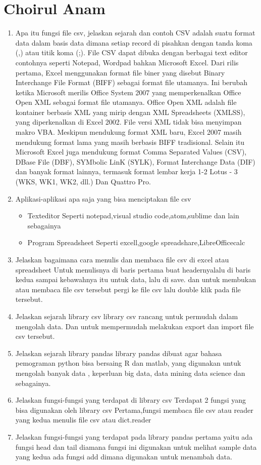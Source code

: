 \section{Choirul Anam}
\begin{enumerate}
    \item Apa itu fungsi file csv, jelaskan sejarah dan contoh
    CSV adalah suatu format data dalam basis data dimana setiap record di pisahkan dengan tanda koma (,) atau titik koma (;). File CSV dapat dibuka dengan berbagai text editor contohnya seperti Notepad, Wordpad bahkan Microsoft Excel.
    Dari rilis pertama, Excel menggunakan format file biner yang disebut Binary Interchange File Format (BIFF) sebagai format file utamanya. Ini berubah ketika Microsoft merilis Office System 2007 yang memperkenalkan Office Open XML sebagai format file utamanya. Office Open XML adalah file kontainer berbasis XML yang mirip dengan XML Spreadsheets (XMLSS), yang diperkenalkan di Excel 2002. File versi XML tidak bisa menyimpan makro VBA.
    Meskipun mendukung format XML baru, Excel 2007 masih mendukung format lama yang masih berbasis BIFF tradisional. Selain itu Microsoft Excel juga mendukung format Comma Separated Values (CSV), DBase File (DBF), SYMbolic LinK (SYLK), Format Interchange Data (DIF) dan banyak format lainnya, termasuk format lembar kerja 1-2 Lotus - 3 (WKS, WK1, WK2, dll.) Dan Quattro Pro.
    \item Aplikasi-aplikasi apa saja yang bisa menciptakan file csv
    \begin{itemize}
        \item Texteditor
        Seperti notepad,visual studio code,atom,sublime dan lain sebagainya
        \item Program Spreadsheet
        Seperti excell,google spreadshare,LibreOfficecalc
    \end{itemize}
    \item Jelaskan bagaimana cara menulis dan membaca file csv di excel atau spreadsheet
    Untuk menulisnya di baris pertama buat headernyalalu di baris kedua sampai kebawahnya itu untuk data, lalu di save.
    dan untuk membukan atau membaca file csv tersebut pergi ke file csv lalu double klik pada file tersebut.
    \item Jelaskan sejarah library csv
    library csv rancang untuk permudah dalam mengolah data. Dan untuk mempermudah melakukan export dan import file csv tersebut.
    \item Jelaskan sejarah library pandas
    library pandas dibuat agar bahasa pemograman python bisa bersaing R dan matlab, yang digunakan untuk mengolah banyak data , keperluan big data, data mining data science dan sebagainya.
    \item Jelaskan fungsi-fungsi yang terdapat di library csv
    Terdapat 2 fungsi yang bisa digunakan oleh library csv
    Pertama,fungsi membaca file csv atau reader
    yang kedua menulis file csv atau dict.reader
   \item Jelaskan fungsi-fungsi yang terdapat pada library pandas
   pertama yaitu ada fungsi head dan tail diamana fungsi ini digunakan untuk melihat sample data
   yang kedua ada fungsi add dimana digunakan untuk menambah data.
\end{enumerate}
